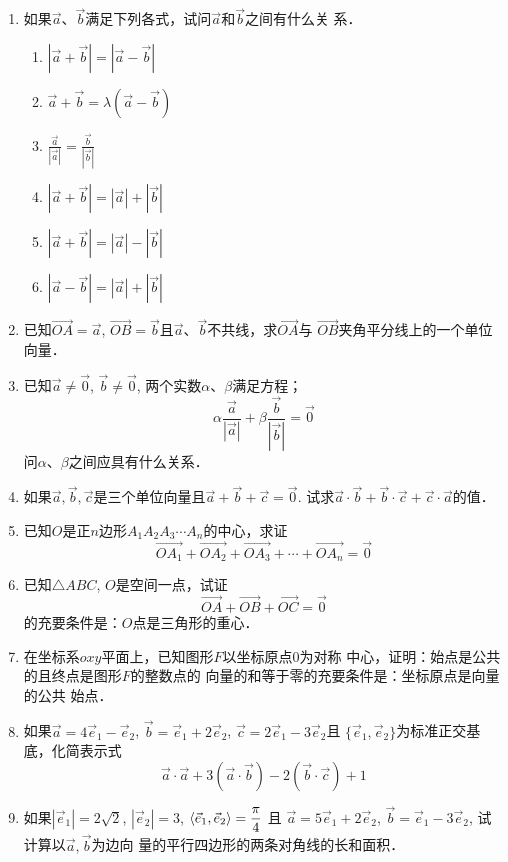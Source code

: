 \begin{enumerate}
    \item 如果$\vec{a}$、$\vec{b}$满足下列各式，试问$\vec{a}$和$\vec{b}$之间有什么关
    系．
\begin{multicols}{2}
\begin{enumerate}
    \item $\left|\vec{a}+\vec{b}\right|=\left|\vec{a}-\vec{b}\right|$
    \item $\vec{a}+\vec{b}=\lambda\left(\vec{a}-\vec{b}\right)$
    \item $\frac{\vec{a}}{\left|\vec{a}\right|}=\frac{\vec{b}}{\left|\vec{b}\right|}$
    \item $\left|\vec{a}+\vec{b}\right|=\left|\vec{a}\right|+\left|\vec{b}\right|$
    \item $\left|\vec{a}+\vec{b}\right|=\left|\vec{a}\right|-\left|\vec{b}\right|$
    \item $\left|\vec{a}-\vec{b}\right|=\left|\vec{a}\right|+\left|\vec{b}\right|$
\end{enumerate}
\end{multicols}

\item 已知$\Vec{OA}=\vec{a}$, $\Vec{OB}=\vec{b}$且$\vec{a}$、$\vec{b}$不共线，求$\Vec{OA}$与
$\Vec{OB}$夹角平分线上的一个单位向量．
\item 已知$\vec{a}\ne \vec{0}$, $\vec{b}\ne\vec{0}$, 两个实数$\alpha$、$\beta$满足方程；
\[\alpha\frac{\vec{a}}{|\vec{a}|}+\beta\frac{\vec{b}}{|\vec{b}|}=\vec{0}\]
问$\alpha$、$\beta$之间应具有什么关系．

\item 如果$\vec{a},\vec{b},\vec{c}$是三个单位向量且$\vec{a}+\vec{b}+\vec{c}=\vec{0}$. 
试求$\vec{a}\cdot \vec{b}+\vec{b}\cdot \vec{c}+\vec{c}\cdot \vec{a}$的值．

\item 已知$O$是正$n$边形$A_1A_2A_3\cdots A_n$的中心，求证
\[\Vec{OA_1}+\Vec{OA_2}+\Vec{OA_3}+\cdots+\Vec{OA_n}=\vec{0}\]
\item 已知$\triangle ABC$, $O$是空间一点，试证
\[\Vec{OA}+\Vec{OB}+\Vec{OC}=\vec{0}\]
的充要条件是：$O$点是三角形的重心．
\item 在坐标系$oxy$平面上，已知图形$F$以坐标原点0为对称
中心，证明：始点是公共的且终点是图形$F$的整数点的
向量的和等于零的充要条件是：坐标原点是向量的公共
始点．

\item 如果$\vec{a}=4\vec{e}_1-\vec{e}_2$, $\vec{b}=\vec{e}_1+2\vec{e}_2$, $\vec{c}=2\vec{e}_1-3\vec{e}_2$且
$\{\vec{e}_1,\vec{e}_2\}$为标准正交基底，化简表示式
\[\vec{a}\cdot \vec{a}+3(\vec{a}\cdot \vec{b})-2(\vec{b}\cdot \vec{c})+1\]
\item 如果$|\vec{e}_1|=2\sqrt{2}$, $|\vec{e}_2|=3$, $\left\langle \vec{e}_1,\vec{e}_2 \right\rangle=\dfrac{\pi}{4}$
且
$\vec{a}=5\vec{e}_1+2\vec{e}_2$, $\vec{b}=\vec{e}_1-3\vec{e}_2$, 试计算以$\vec{a},\vec{b}$为边向
量的平行四边形的两条对角线的长和面积．



\end{enumerate}
